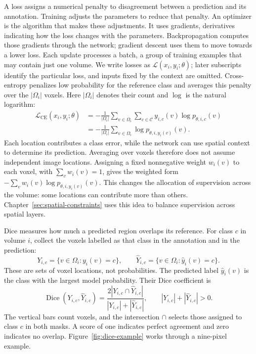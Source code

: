 \documentclass[12pt,a4paper]{article}
\begin{document}
A loss assigns a numerical penalty to disagreement between a prediction
and its annotation. Training adjusts the parameters to reduce that
penalty. An optimizer is the algorithm that makes these adjustments.
It uses gradients, derivatives indicating how the loss changes with the
parameters. Backpropagation computes those gradients through the network;
gradient descent uses them to move towards a lower loss. Each update
processes a batch, a group of training examples that may contain just
one volume. We write losses as $\mathcal L(x_i,y_i;\theta)$; later subscripts
identify the particular loss, and inputs fixed by the context are omitted.
Cross-entropy penalizes low probability for the reference class and
averages this penalty over the $|\Omega_i|$ voxels. Here $|\Omega_i|$
denotes their count and $\log$ is the natural logarithm:
\begin{equation}
\begin{aligned}
\mathcal{L}_{\mathrm{CE}}(x_i,y_i;\theta)
&=-\frac{1}{|\Omega_i|}\sum_{v\in\Omega_i}
  \sum_{c\in\mathcal{C}}y_{i,c}(v)\log p_{\theta,i,c}(v)\\
&=-\frac{1}{|\Omega_i|}\sum_{v\in\Omega_i}
  \log p_{\theta,i,y_i(v)}(v).
\end{aligned}
\label{eq:cross-entropy}
\end{equation}
Each location contributes a class error, while the network can use spatial
context to determine its prediction. Averaging over voxels therefore
does not assume independent image locations. Assigning a fixed nonnegative
weight $w_i(v)$ to each voxel, with $\sum_v w_i(v)=1$, gives the weighted form
$-\sum_v w_i(v)\log p_{\theta,i,y_i(v)}(v)$. This changes the allocation
of supervision across the volume: some locations can contribute more
than others. Chapter~\ref{sec:spatial-constraints} uses this idea to
balance supervision across spatial layers.

Dice measures how much a predicted region overlaps its reference.
For class $c$ in volume $i$, collect the voxels labelled as that class
in the annotation and in the prediction:
\[
Y_{i,c}=\{v\in\Omega_i:y_i(v)=c\},
\qquad
\widehat Y_{i,c}=\{v\in\Omega_i:\widehat y_i(v)=c\}.
\]
These are sets of voxel locations, not probabilities. The predicted
label $\widehat y_i(v)$ is the class with the largest model probability.
Their Dice coefficient is
\begin{equation}
\operatorname{Dice}(Y_{i,c},\widehat Y_{i,c})
=\frac{2|Y_{i,c}\cap\widehat Y_{i,c}|}
       {|Y_{i,c}|+|\widehat Y_{i,c}|},
\qquad |Y_{i,c}|+|\widehat Y_{i,c}|>0.
\label{eq:dice-set-definition}
\end{equation}
The vertical bars count voxels, and the intersection $\cap$ selects
those assigned to class $c$ in both masks. A score of one indicates
perfect agreement and zero indicates no overlap.
Figure~\ref{fig:dice-example} works through a nine-pixel example.
\end{document}
